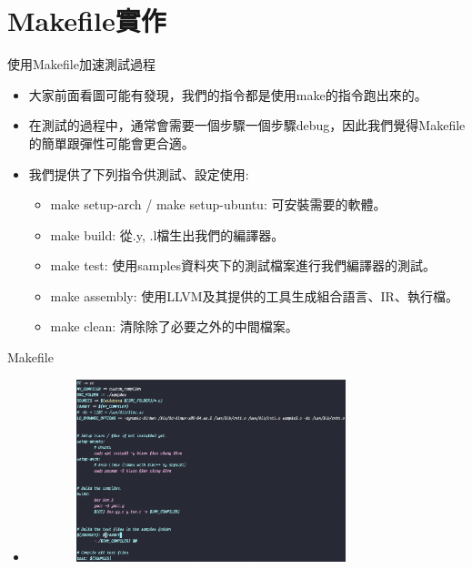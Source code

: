 \documentclass{beamer}
\begin{document}
\section{Makefile實作}
\begin{frame}{使用Makefile加速測試過程}
\begin{itemize}
    \item 大家前面看圖可能有發現，我們的指令都是使用make的指令跑出來的。
    \item 在測試的過程中，通常會需要一個步驟一個步驟debug，因此我們覺得Makefile的簡單跟彈性可能會更合適。
    \item 我們提供了下列指令供測試、設定使用:
    \begin{itemize}
        \item make setup-arch / make setup-ubuntu: 可安裝需要的軟體。
        \item make build: 從.y, .l檔生出我們的編譯器。
        \item make test: 使用samples資料夾下的測試檔案進行我們編譯器的測試。
        \item make assembly: 使用LLVM及其提供的工具生成組合語言、IR、執行檔。
        \item make clean: 清除除了必要之外的中間檔案。
    \end{itemize}
\end{itemize}
\end{frame}

\begin{frame}{Makefile}
\begin{itemize}
    \item \includegraphics[width=300pt,height=150pt]{makefile1.png}
\end{itemize}
\end{frame}
\end{document}
